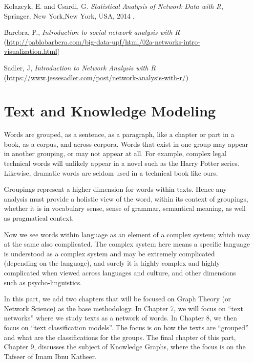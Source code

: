 \documentclass[
]{article}
\begin{document}
Kolazcyk, E. and Csardi, G. \emph{Statistical Analysis of Network Data with R}, Springer, New York,New York, USA, 2014 \citep{csardi2014}.

Barebra, P., \emph{Introduction to social network analysis with R} (\url{http://pablobarbera.com/big-data-upf/html/02a-networks-intro-visualization.html})

Sadler, J, \emph{Introduction to Network Analysis with R} (\url{https://www.jessesadler.com/post/network-analysis-with-r/})

\hypertarget{text-and-knowledge-modeling}{%
\section*{Text and Knowledge Modeling}\label{text-and-knowledge-modeling}}

Words are grouped, as a sentence, as a paragraph, like a chapter or part in a book, as a corpus, and across corpora. Words that exist in one group may appear in another grouping, or may not appear at all. For example, complex legal technical words will unlikely appear in a novel such as the Harry Potter series. Likewise, dramatic words are seldom used in a technical book like ours.

Groupings represent a higher dimension for words within texts. Hence any analysis must provide a holistic view of the word, within its context of groupings, whether it is in vocabulary sense, sense of grammar, semantical meaning, as well as pragmatical context.

Now we see words within language as an element of a complex system; which may at the same also complicated. The complex system here means a specific language is understood as a complex system and may be extremely complicated (depending on the language), and surely it is highly complex and highly complicated when viewed across languages and culture, and other dimensions such as psycho-linguistics.

In this part, we add two chapters that will be focused on Graph Theory (or Network Science) as the base methodology. In Chapter 7, we will focus on ``text networks'' where we study texts as a network of words. In Chapter 8, we then focus on ``text classification models''. The focus is on how the texts are ``grouped'' and what are the classifications for the groups. The final chapter of this part, Chapter 9, discusses the subject of Knowledge Graphs, where the focus is on the Tafseer of Imam Ibnu Katheer.
\end{document}
